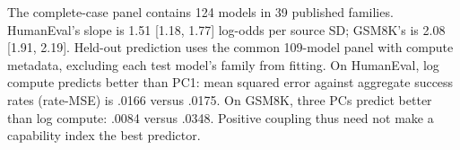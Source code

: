 The complete-case panel contains 124 models in 39 published families. HumanEval's slope is 1.51 [1.18, 1.77] log-odds per source SD; GSM8K's is 2.08 [1.91, 2.19]. Held-out prediction uses the common 109-model panel with compute metadata, excluding each test model's family from fitting. On HumanEval, log compute predicts better than PC1: mean squared error against aggregate success rates (rate-MSE) is .0166 versus .0175. On GSM8K, three PCs predict better than log compute: .0084 versus .0348. Positive coupling thus need not make a capability index the best predictor.

